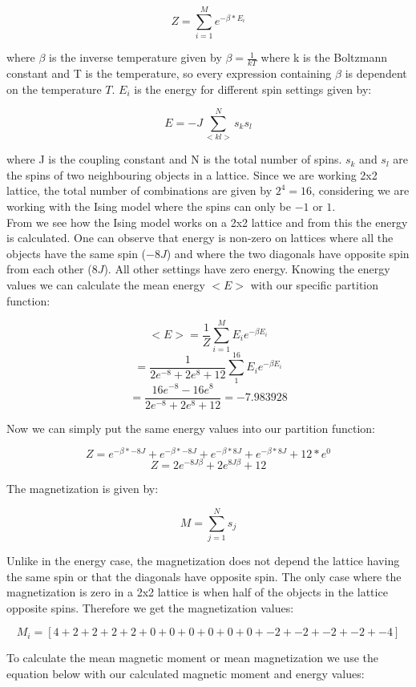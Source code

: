 \documentclass[10pt,a4paper]{article}
\begin{document}
$$
Z = \sum^{M}_{i = 1} e^{-\beta * E_i}
$$ 

\noindent where $\beta$ is the inverse temperature given by $\beta = \frac{1}{kT}$ where k is the Boltzmann constant and T is the temperature, so every expression containing $\beta$ is dependent on the temperature $T$. $E_i$ is the energy for different spin settings given by:

$$
E = -J\sum^{N}_{<kl>} s_ks_l
$$

\noindent where J is the coupling constant and N is the total number of spins. $s_k$ and $s_l$ are the spins of two neighbouring objects in a lattice. Since we are working 2x2 lattice, the total number of combinations are given by $2^4 = 16$, considering we are working with the Ising model where the spins can only be $-1$ or $1$.
\\
From  we see how the Ising model works on a 2x2 lattice and from this the energy is calculated. One can observe that energy is non-zero on lattices where all the objects have the same spin ($-8J$) and where the two diagonals have opposite spin from each other ($8J$). All other settings have zero energy. Knowing the energy values we can calculate the mean energy $<E>$ with our specific partition function:

$$
<E> = \frac{1}{Z}\sum^{M}_{i = 1} E_i e^{-\beta E_i}
$$
$$
 = \frac{1}{2e^{-8} + 2e^{8} + 12}\sum^{16}_{1} E_i e^{-\beta E_i}
$$
$$
 = \frac{16e^{-8}-16e^{8}}{2e^{-8} + 2e^{8} + 12} = -7.983928
$$

\noindent Now we can simply put the same energy values into our partition function:

$$
Z = e^{-\beta * -8J} + e^{-\beta * -8J} + e^{-\beta * 8J} + e^{-\beta * 8J} + 12*e^0
$$
$$
Z = 2e^{-8J\beta} + 2e^{8J\beta} + 12
$$

\noindent The magnetization is given by:

$$
M = \sum^{N}_{j = 1} s_j
$$

\noindent Unlike in the energy case, the magnetization does not depend the lattice having the same spin or that the diagonals have opposite spin. The only case where the magnetization is zero in a 2x2 lattice is when half of the objects in the lattice opposite spins. Therefore we get the magnetization values:

$$
M_i = [4 + 2 + 2 + 2 + 2 + 0 + 0 + 0 + 0 + 0 + 0 + -2 + -2 + -2 + -2 + -4]
$$

\noindent To calculate the mean magnetic moment or mean magnetization we use the equation below with our calculated magnetic moment and energy values:
\end{document}
